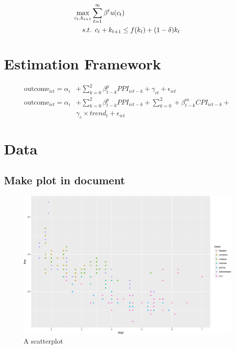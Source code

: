 \documentclass[12pt,]{article}
\newcommand{\maximise}{\operatornamewithlimits{max}}
\begin{document}
\begin{align*}
\maximise_{c_t,k_{t+1}} &  \sum_{t=1}^{\infty} \beta^t u(c_t)  \\
  s.t. & \enspace c_{t} + k_{t+1} \leq f(k_t) + (1-\delta)k_t
\end{align*}

\section{Estimation Framework}\label{estimation-framework}

\begin{align*}
\text{outcome}_{ict} = \alpha_i & + \sum_{k=0}^2 \beta_{t-k}^p
PPI_{ict-k} + \gamma_{ct} + \epsilon_{ict} \\
\text{outcome}_{ict} = \alpha_i & + \sum_{k=0}^2 \beta_{t-k}^p PPI_{ict-k} +
\sum_{k=0}^2 + \beta_{t-k}^m CPI_{ict-k} + \\ & \gamma_{c}\times
trend_t + \epsilon_{ict}
\end{align*}

\section{Data}\label{data}

\subsection{Make plot in document}\label{make-plot-in-document}

\begin{figure}
\centering
\includegraphics{Figs/unnamed-chunk-2-1.pdf}
\caption{A scatterplot}
\end{figure}
\end{document}
